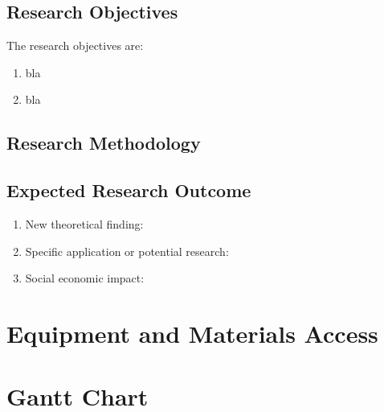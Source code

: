 \documentclass[bibliography=totoc]{article}
\begin{document}
%
%
\printbibliography

\subsection{Research Objectives}

The research objectives are:
\begin{enumerate}
  \item bla
  \item bla
\end{enumerate}

\subsection{Research Methodology}

\subsection{Expected Research Outcome}

\begin{enumerate}
  \item New theoretical finding:
  \item Specific application or potential research:
  \item Social economic impact:
\end{enumerate}

\section{Equipment and Materials Access}

\section{Gantt Chart}
\end{document}
